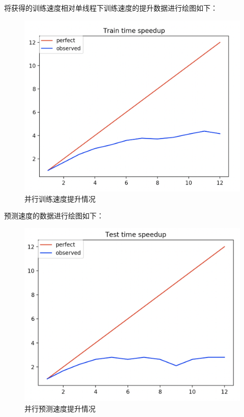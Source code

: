 \documentclass[12pt]{article}
\begin{document}
将获得的训练速度相对单线程下训练速度的提升数据进行绘图如下：
\begin{figure}[H]
    \centering
    \includegraphics[scale=0.4]{train_time_speedup.png}
    \caption{并行训练速度提升情况}
    \label{}
\end{figure}

预测速度的数据进行绘图如下：
\begin{figure}[H]
    \centering
    \includegraphics[scale=0.4]{test_time_speedup.png}
    \caption{并行预测速度提升情况}
    \label{}
\end{figure}
\end{document}

